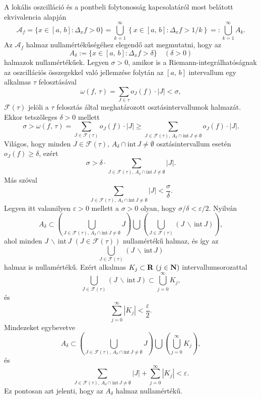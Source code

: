 A lokális oszcilláció és a pontbeli folytonosság kapcsolatáról most belátott ekvivalencia alapján
\[
	\mathcal{A}_f = \{ x \in [a, \, b] : \Delta_x f > 0\} = \bigcup_{k = 1}^\infty \left\{ x \in [a, \, b] : \Delta_x f > 1/k\right\} =: \bigcup_{k=1}^\infty A_k.
\]
Az $\mathcal{A}_f$ halmaz nullamértékűségéhez elegendő azt megmutatni, hogy az
\[
	A_\delta := \{ x \in [a, \, b] : \Delta_x f > \delta\} \quad (\delta > 0)
\]
halmazok nullamértékűek. Legyen $\sigma > 0$, amikor is a Riemann-integrálhatóságnak az oszcillációs összegekkel való jellemzése folytán az $[a, \, b]$ intervallum egy alkalmas $\tau$ felosztásával
\[
	\omega(f, \, \tau) = \sum_{J \in \mathcal{\tau}} o_J(f) \cdot |J| < \sigma,
\]
$\mathcal{F}(\tau)$ jelöli a $\tau$ felosztás által meghatározott osztásintervallumok halmazát. Ekkor tetszőleges $\delta > 0$ mellett
\[
	\sigma > \omega(f, \, \tau) = \sum_{J \in \mathcal{F}(\tau)} o_J(f) \cdot |J| \geq \sum_{J \in \mathcal{F}(\tau), \, A_\delta \cap \text{int} \, J \neq \emptyset} o_J(f) \cdot |J|.
\]
Világos, hogy minden $J \in \mathcal{F}(\tau), \, A_\delta \cap \text{int} \, J \neq \emptyset$ osztásintervallum esetén $o_J(f) \geq \delta$, ezért
\[
	\sigma > \delta \cdot \sum_{J \in \mathcal{F}(\tau), \, A_\delta \cap \text{int} \, J \neq \emptyset} |J|.
\]
Más szóval
\[
\sum_{J \in \mathcal{F}(\tau), \, A_\delta \cap \text{int} \, J \neq \emptyset} |J| < \frac{\sigma}{\delta}.
\]
Legyen itt valamilyen $\varepsilon > 0$ mellett a $\sigma > 0$ olyan, hogy $\sigma / \delta < \varepsilon / 2$. Nyilván
\[
	A_\delta \subset \left( \bigcup_{J \in \mathcal{F}(\tau), \, A_\delta \cap \text{int} \, J \neq \emptyset} J \right) \bigcup \left( \bigcup_{J \in \mathcal{F}(\tau)} (J \, \backslash \, \text{int} \, J) \right),
\]
ahol minden $J \, \backslash \, \text{int} \, J \, \, (J \in \mathcal{F}(\tau))$ nullamértékű halmaz, és így az 
\[
	\bigcup_{J \in \mathcal{F}(\tau)} (J \, \backslash \, \text{int} \, J)
\]
halmaz is nullamértékű. Ezért alkalmas $K_j \subset \mathbf{R} \, \, (j \in \mathbf{N})$ intervallumsorozattal
\[
	\bigcup_{J \in \mathcal{F}(\tau)} (J \, \backslash \, \text{int} \, J) \subset \bigcup_{j=0}^\infty K_j,
\]
és
\[
	\sum_{j=0}^\infty |K_j| < \frac{\varepsilon}{2}.
\]
Mindezeket egybevetve
\[
	A_\delta \subset \left( \bigcup_{J \in \mathcal{F}(\tau), \, A_\delta \cap \text{int} \, J \neq \emptyset} J \right) \bigcup \left(\bigcup_{j=0}^\infty K_j\right),
\]
és
\[
	\sum_{J \in \mathcal{F}(\tau), \, A_\delta \cap \text{int} \, J \neq \emptyset} |J| + \sum_{j=0}^\infty |K_j| < \varepsilon.
\]
Ez pontosan azt jelenti, hogy az $A_\delta$ halmaz nullamértékű.

